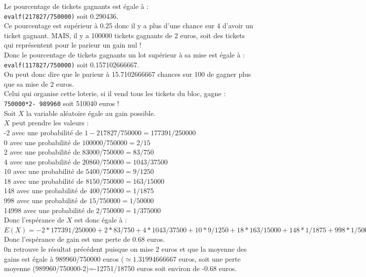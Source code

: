 \documentclass[a4paper,11pt]{book}
\begin{document}
Le pourcentage de tickets gagnants est \'egale \`a :\\
{\tt evalf(217827/750000)} soit 0.290436.\\
Ce pourcentage est sup\'erieur \`a 0.25 donc il y a plus d'une chance sur 4 
d'avoir un ticket gagnant. MAIS, il y a 100000 tickets gagnants de 2 euros, 
soit des tickets qui repr\'esentent pour le parieur un gain nul ! \\
Donc le pourcentage de tickets gagnants un lot sup\'erieur \`a sa mise
est \'egale \`a :\\
{\tt evalf(117827/750000)} soit 0.157102666667.\\
On peut donc dire que le parieur \`a 15.7102666667 chances sur 100 de gagner 
plus que sa mise de 2 euros.\\
Celui qui organise cette loterie, si il vend tous les tickets du bloc, gagne :\\
{\tt 750000*2- 989960} soit 510040 euros !\\
Soit $X$ la variable al\'eatoire \'egale au gain possible.\\
 $X$ peut prendre les valeurs :\\
-2 avec une probabilit\'e de $1-217827/750000=177391/250000$\\
0 avec une probabilit\'e de $100000/750000=2/15$\\
2  avec une probabilit\'e de $83000/750000=83/750$\\
4  avec une probabilit\'e de $20860/750000=1043/37500$\\
10  avec une probabilit\'e de $5400/750000=9/1250$\\
18  avec une probabilit\'e de $8150/750000=163/15000$\\
148  avec une probabilit\'e de $ 400/750000=1/1875$\\
998   avec une probabilit\'e de $15 /750000=1/50000$\\
14998  avec une probabilit\'e de $2/750000=1/375000$\\ 
Donc l'esp\'erance de $X$ est donc \'egale \`a :\\
$E(X)=-2*177391/250000+2*83/750+4*1043/37500+10*9/1250+18*163/15000+
148*1/1875+998*1/50000+14998*1/375000=-12751/18750\simeq -0.680053333333$
Donc l'esp\'erance de gain est une perte de 0.68 euros.\\
0n retrouve le r\'esultat pr\'ec\'edent puisque on mise 2 euros et que la 
moyenne des gains est \'egale \`a 989960/750000 euros ($\simeq 1.31994666667$ 
euros, soit une perte moyenne (989960/750000-2)=-12751/18750 euros soit environ
de -0.68 euros.
\end{document}
